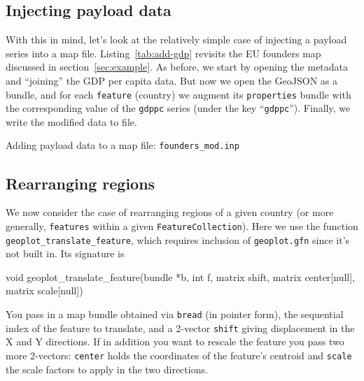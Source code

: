 \documentclass{article}
\begin{document}
\subsection{Injecting payload data}
\label{sec:inject}

With this in mind, let's look at the relatively simple case of
injecting a payload series into a map file. Listing~\ref{tab:add-gdp}
revisits the EU founders map discussed in section~\ref{sec:example}.
As before, we start by opening the metadata and ``joining'' the GDP
per capita data. But now we open the GeoJSON as a bundle, and for each
\texttt{feature} (country) we augment its \texttt{properties} bundle
with the corresponding value of the \texttt{gdppc} series (under the
key ``\texttt{gdppc}''). Finally, we write the modified data to file.

\begin{script}[p]
  \caption{Adding payload data to a map file:
    \texttt{founders\_mod.inp}}
  \label{tab:add-gdp}
\end{script}

\subsection{Rearranging regions}
\label{sec:rearrange}

We now consider the case of rearranging regions of a given country (or
more generally, \texttt{features} within a given
\texttt{FeatureCollection}). Here we use the function
\texttt{geoplot\_translate\_feature}, which requires inclusion of
\texttt{geoplot.gfn} since it's not built in. Its signature is
\begin{code}
void geoplot_translate_feature(bundle *b, int f,
                               matrix shift,
                               matrix center[null],
                               matrix scale[null])
\end{code}
You pass in a map bundle obtained via \texttt{bread} (in pointer
form), the sequential index of the feature to translate, and a
2-vector \texttt{shift} giving displacement in the X and Y
directions. If in addition you want to rescale the feature you pass
two more 2-vectors: \texttt{center} holds the coordinates of the
feature's centroid and \texttt{scale} the scale factors to apply in
the two directions.
\end{document}
